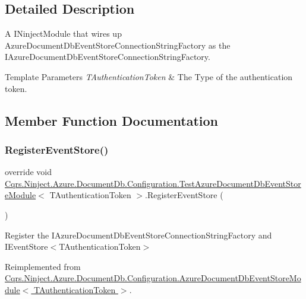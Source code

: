 \subsection{Detailed Description}
A I\+Ninject\+Module that wires up Azure\+Document\+Db\+Event\+Store\+Connection\+String\+Factory as the I\+Azure\+Document\+Db\+Event\+Store\+Connection\+String\+Factory. 


\begin{DoxyTemplParams}{Template Parameters}
{\em T\+Authentication\+Token} & The Type of the authentication token.\\
\hline
\end{DoxyTemplParams}


\subsection{Member Function Documentation}
\mbox{\label{classCqrs_1_1Ninject_1_1Azure_1_1DocumentDb_1_1Configuration_1_1TestAzureDocumentDbEventStoreModule_a2b3e6c1f8edd6aa4101b98df7d1be93e_a2b3e6c1f8edd6aa4101b98df7d1be93e}} 
\subsubsection{\texorpdfstring{Register\+Event\+Store()}{RegisterEventStore()}}
{\footnotesize\ttfamily override void \hyperlink{classCqrs_1_1Ninject_1_1Azure_1_1DocumentDb_1_1Configuration_1_1TestAzureDocumentDbEventStoreModule}{Cqrs.\+Ninject.\+Azure.\+Document\+Db.\+Configuration.\+Test\+Azure\+Document\+Db\+Event\+Store\+Module}$<$ T\+Authentication\+Token $>$.Register\+Event\+Store (\begin{DoxyParamCaption}{ }\end{DoxyParamCaption})\hspace{0.3cm}{\ttfamily [virtual]}}



Register the I\+Azure\+Document\+Db\+Event\+Store\+Connection\+String\+Factory and I\+Event\+Store$<$\+T\+Authentication\+Token$>$ 



Reimplemented from \hyperlink{classCqrs_1_1Ninject_1_1Azure_1_1DocumentDb_1_1Configuration_1_1AzureDocumentDbEventStoreModule_a9aad9974c48acdbabb458117d7ab9e82_a9aad9974c48acdbabb458117d7ab9e82}{Cqrs.\+Ninject.\+Azure.\+Document\+Db.\+Configuration.\+Azure\+Document\+Db\+Event\+Store\+Module$<$ T\+Authentication\+Token $>$}.


